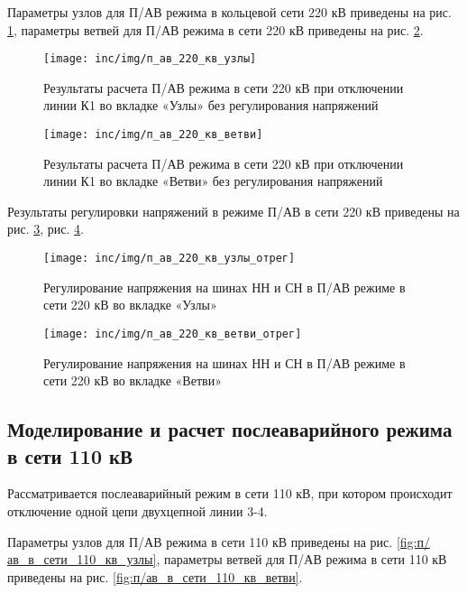 Параметры узлов для П/АВ режима в кольцевой сети 220 кВ приведены на рис. \ref{fig:п/ав_в_сети_220_кв_узлы}, параметры ветвей для П/АВ режима в сети 220 кВ приведены на рис. \ref{fig:п/ав_в_сети_220_кв_ветви}.

\begin{figure}[H]
	\centering
	\texttt{[image: inc/img/п\_ав\_220\_кв\_узлы]}
	\caption{Результаты расчета П/АВ режима в сети 220 кВ при отключении линии К1 во вкладке «Узлы» без регулирования напряжений}
	\label{fig:п/ав_в_сети_220_кв_узлы}
\end{figure}

\begin{figure}[H]
	\centering
	\texttt{[image: inc/img/п\_ав\_220\_кв\_ветви]}
	\caption{Результаты расчета П/АВ режима в сети 220 кВ при отключении линии К1 во вкладке «Ветви» без регулирования напряжений}
	\label{fig:п/ав_в_сети_220_кв_ветви}
\end{figure}

Результаты регулировки напряжений в режиме П/АВ в сети 220 кВ приведены на рис. \ref{fig:п/ав_в_сети_220_кв_узлы_отрег}, рис. \ref{fig:п/ав_в_сети_220_кв_ветви_отрег}.

\begin{figure}[H]
	\centering
	\texttt{[image: inc/img/п\_ав\_220\_кв\_узлы\_отрег]}
	\caption{Регулирование напряжения на шинах НН и СН в П/АВ режиме в сети 220 кВ во вкладке «Узлы»}
	\label{fig:п/ав_в_сети_220_кв_узлы_отрег}
\end{figure}

\begin{figure}[H]
	\centering
	\texttt{[image: inc/img/п\_ав\_220\_кв\_ветви\_отрег]}
	\caption{Регулирование напряжения на шинах НН и СН в П/АВ режиме в сети 220 кВ во вкладке «Ветви»}
	\label{fig:п/ав_в_сети_220_кв_ветви_отрег}
\end{figure}

\subsection{Моделирование и расчет послеаварийного режима в сети 110 кВ}

Рассматривается послеаварийный режим в сети 110 кВ, при котором происходит отключение одной цепи двухцепной линии 3-4.

Параметры узлов для П/АВ режима в сети 110 кВ приведены на рис. \ref{fig:п/ав_в_сети_110_кв_узлы}, параметры ветвей для П/АВ режима в сети 110 кВ приведены на рис. \ref{fig:п/ав_в_сети_110_кв_ветви}.

